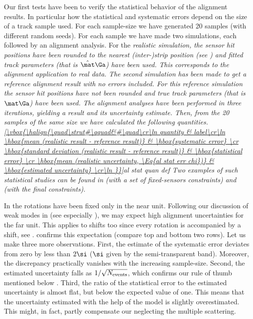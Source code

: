 Our first  tests have been to verify the statistical behavior of the alignment results. In particular how the statistical and systematic errors depend on the size of a track sample used. For each sample-size we have generated 20 samples (with different random seeds). For each sample we have made two simulations, each followed by an alignment analysis. For the \em{realistic simulation}, the sensor hit positions have been rounded to the nearest (inter-)strip position (see ) and fitted track parameters (that is $\hat\mat\Ga$) have been used. This corresponds to the alignment application to real data. The second simulation has been made to get a reference alignment result with no errors included. For this \em{reference simulation} the sensor hit positions have not been rounded and true track parameters (that is $\mat\Ga$) have been used. The alignment analyses have been performed in three iterations, yielding a result and its uncertainty estimate. Then, from the 20 samples of the same size we have calculated the following quantities.
\eqref{\vbox{\halign{\quad\strut#\qquad&#\quad\cr\ln
quantity & label\cr\ln
\hbox{mean (realistic result - reference result)}				& \hbox{systematic error} \cr
\hbox{standard deviation (realistic result - reference result)}	& \hbox{statistical error} \cr
\hbox{mean (realistic uncertainty, \Eq{al stat err chi})} 		& \hbox{estimated uncertainty} \cr\ln
}}}{al stat quan def}
Two examples of such statistical studies can be found in  (with a set of fixed-sensors constraints) and  (with the final constraints).

In  the rotations have been fixed only in the near unit. Following our discussion of weak modes in  (see especially ), we may expect high alignment uncertainties for the far unit. This applies to shifts too since every rotation is accompanied by a shift, see .  confirms this expectation (compare top and bottom two rows). Let us make three more observations. First, the estimate of the systematic error deviates from zero by less than $2\si$ ($\si$ given by the semi-transparent band). Moreover, the discrepancy practically vanishes with the increasing sample-size. Second, the estimated uncertainty falls as $1/\sqrt{N_{\rm events}}$, which confirms our rule of thumb mentioned below . Third, the ratio of the statistical error to the estimated uncertainty is almost flat, but below the expected value of one. This means that the uncertainty estimated with the help of the model  is slightly overestimated. This might, in fact, partly compensate our neglecting the multiple scattering.

